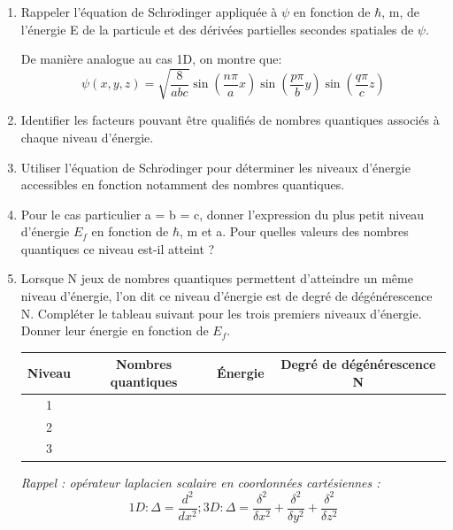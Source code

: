 \documentclass{article}
\begin{document}
\begin{enumerate}
    \item Rappeler l’équation de Schr$\ddot{o}$dinger appliquée à $\psi$ en fonction de $\hbar$, m, de l’énergie E de la particule et des dérivées partielles secondes spatiales de $\psi$.

    \newline\newline De manière analogue au cas 1D, on montre que:
    \[ \psi(x,y,z) = \sqrt{\frac{8}{abc}}\sin\left(\frac{n\pi}{a}x\right) \sin\left(\frac{p\pi}{b}y\right) \sin\left(\frac{q\pi}{c}z\right) \]

    \item Identifier les facteurs pouvant être qualifiés de nombres quantiques associés à chaque niveau d’énergie.
    \item Utiliser l’équation de Schr$\ddot{o}$dinger pour déterminer les niveaux d’énergie accessibles en fonction notamment des nombres quantiques.
    \item Pour le cas particulier a = b = c, donner l’expression du plus petit niveau d’énergie $E_{f}$ en fonction de $\hbar$, m et a. Pour quelles valeurs des nombres quantiques ce niveau est-il atteint ?
    \item Lorsque N jeux de nombres quantiques permettent d’atteindre un même niveau d’énergie, l’on dit ce niveau d’énergie est de degré de dégénérescence N. Compléter le tableau suivant pour les trois premiers niveaux d’énergie. Donner leur énergie en fonction de $E_{f}$.\newline\newline
    \begin{centering}
        \begin{tabular}{|c|c|c|c|}
            \hline
            Niveau & Nombres quantiques & Énergie & Degré de dégénérescence N \\
            \hline
            1 & & & \\
            \hline
            2 & & & \\
            \hline
            3 & & & \\
            \hline
        \end{tabular}
    \end{centering}\newline\newline
    \textit{Rappel : opérateur laplacien scalaire en coordonnées cartésiennes :}
    \[ 1D : \Delta = \frac{d^{2}}{dx^{2}}; 3D : \Delta = \frac{\delta^{2}}{\delta x^{2}} + \frac{\delta^{2}}{\delta y^{2}} + \frac{\delta^{2}}{\delta z^{2}} \]
\end{enumerate}
\end{document}
